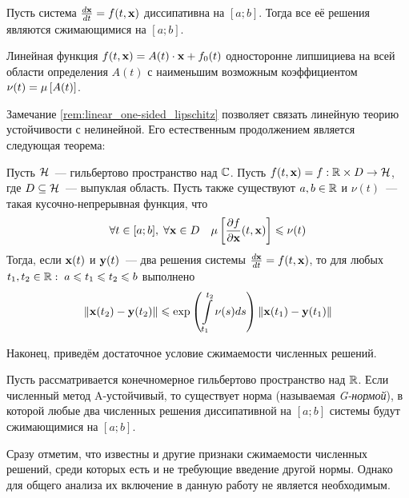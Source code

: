 \begin{statement}
    \label{def:contractivity_condition}
    Пусть система $ \frac{d \mathbf{x}}{d t} = f(t, \mathbf{x}) $ диссипативна на $ [a; b] $.
    Тогда все её решения являются сжимающимися на $ [a; b] $.
\end{statement}

\begin{remark}
    \label{rem:linear_one-sided_lipschitz}
    Линейная функция $ f(t, \mathbf{x}) = A(t) \cdot \mathbf{x} + f_0(t) $ односторонне липшициева на всей области определения $ A(t) $
    с наименьшим возможным коэффициентом $ \nu(t) = \mu \left[ A(t) \right] $.
\end{remark}

Замечание \ref{rem:linear_one-sided_lipschitz} позволяет связать линейную теорию устойчивости с нелинейной.
Его естественным продолжением является следующая теорема:

\begin{theorem}[Далквист, 1959]
    \label{thm:nonlinear_to_linear}
    Пусть $ \mathcal{H} $~--- гильбертово пространство над $ \mathbb{C} $.
    Пусть $ f(t, \mathbf{x}) = f: \mathbb{R} \times D \to \mathcal{H} $,
    где $ D \subseteq \mathcal{H} $~--- выпуклая область.
    Пусть также существуют $ a, b \in \mathbb{R} $ и $ \nu(t) $~--- такая кусочно-непрерывная функция, что
    \[
        \forall t \in [a; b], \; \forall \mathbf{x} \in D \quad \mu \left[ \frac{\partial f}{\partial \mathbf{x}}(t, \mathbf{x}) \right] \leqslant \nu(t)
    \]
    Тогда, если $ \mathbf{x}(t) $ и $ \mathbf{y}(t) $~--- два решения системы $ \frac{d \mathbf{x}}{d t} = f(t, \mathbf{x}) $,
    то для любых $ t_1, t_2 \in \mathbb{R}: \; a \leqslant t_1 \leqslant t_2 \leqslant b $ выполнено
    \[
        \| \mathbf{x}(t_2) - \mathbf{y}(t_2) \| \leqslant \exp\left( \int\limits_{t_1}^{t_2} \nu(s) ds \right) \| \mathbf{x}(t_1) - \mathbf{y}(t_1) \|
    \]
\end{theorem}

Наконец, приведём достаточное условие сжимаемости численных решений.

\begin{theorem}[Далквист, 1978]
    Пусть рассматривается конечномерное гильбертово пространство над $ \mathbb{R} $.
    Если численный метод A-устойчивый, то существует норма (называемая \emph{G-нормой}),
    в которой любые два численных решения диссипативной на $ [a; b] $ системы будут сжимающимися на $ [a; b] $.
\end{theorem}

Сразу отметим, что известны и другие признаки сжимаемости численных решений,
среди которых есть и не требующие введение другой нормы.
Однако для общего анализа их включение в данную работу не является необходимым.

